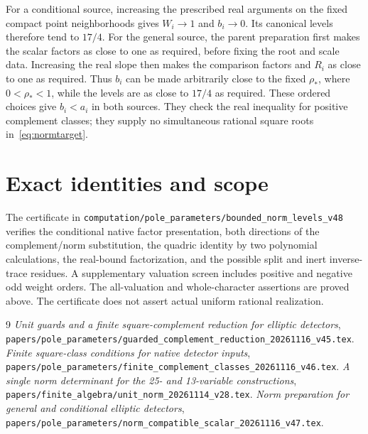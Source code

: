 \documentclass[11pt,a4paper]{article}
\begin{document}
For a conditional source, increasing the prescribed real arguments
on the fixed compact point neighborhoods gives $W_i\to1$ and
$b_i\to0$. Its canonical levels therefore tend to $17/4$.
For the general source, the parent preparation first makes the scalar
factors as close to one as required, before fixing the root and scale
data. Increasing the real slope then makes the comparison factors and
$R_i$ as close to one as required. Thus $b_i$ can be made arbitrarily
close to the fixed $\rho_*$, where $0<\rho_*<1$, while the levels
are as close to $17/4$ as required. These ordered choices give
$b_i<a_i$ in both sources. They check the real inequality for positive
complement classes; they supply no simultaneous rational square roots
in~\eqref{eq:normtarget}.

\section{Exact identities and scope}

The certificate in
\nolinkurl{computation/pole_parameters/bounded_norm_levels_v48}
verifies the conditional native factor presentation, both directions
of the complement/norm substitution, the quadric identity by two
polynomial calculations, the real-bound factorization, and the
possible split and inert inverse-trace residues. A supplementary
valuation screen includes positive and negative odd weight orders.
The all-valuation and whole-character assertions are proved above.
The certificate does not assert actual uniform rational realization.

\begin{thebibliography}{9}
\emph{Unit guards and a finite square-complement reduction for elliptic detectors},
\nolinkurl{papers/pole_parameters/guarded_complement_reduction_20261116_v45.tex}.
\emph{Finite square-class conditions for native detector inputs},
\nolinkurl{papers/pole_parameters/finite_complement_classes_20261116_v46.tex}.
\emph{A single norm determinant for the 25- and 13-variable constructions},
\nolinkurl{papers/finite_algebra/unit_norm_20261114_v28.tex}.
\emph{Norm preparation for general and conditional elliptic detectors},
\nolinkurl{papers/pole_parameters/norm_compatible_scalar_20261116_v47.tex}.
\end{thebibliography}
\end{document}
